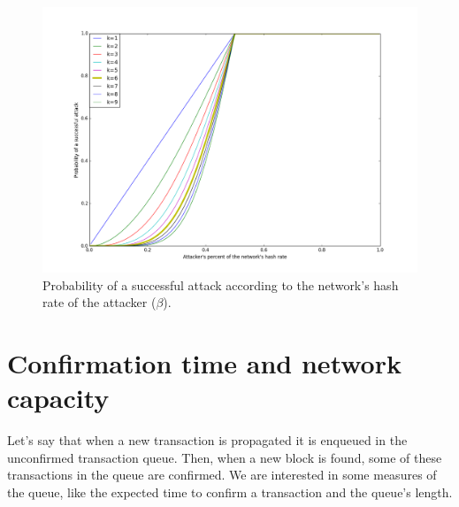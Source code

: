 \begin{figure}[ht]
\centering\includegraphics[width=\textwidth]{./images01/fig-bitcoin-attack.png}
\caption{Probability of a successful attack according to the network's hash rate of the attacker ($\beta$).\label{fig-bitcoin-attack}}
\end{figure}




\section{Confirmation time and network capacity}

Let's say that when a new transaction is propagated it is enqueued in the unconfirmed transaction queue. Then, when a new block is found, some of these transactions in the queue are confirmed. We are interested in some measures of the queue, like the expected time to confirm a transaction and the queue's length.

